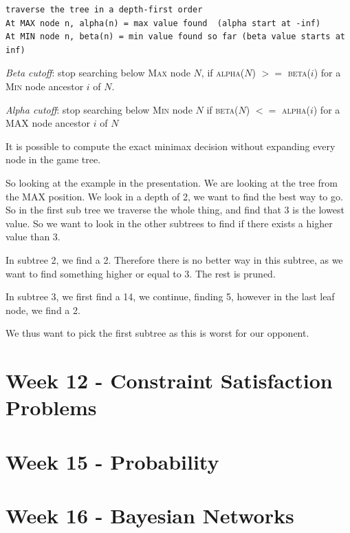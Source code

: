 \documentclass{article}
\begin{document}
\begin{lstlisting}[inputencoding=utf8/latin1, basicstyle=\footnotesize, keywordstyle=\color{blue}\bfseries, rulecolor=\color{black}]
traverse the tree in a depth-first order
At MAX node n, alpha(n) = max value found  (alpha start at -inf)
At MIN node n, beta(n) = min value found so far (beta value starts at inf)
\end{lstlisting}

\emph{Beta cutoff}: stop searching below \textsc{Max} node $N$, if
\textsc{alpha($N$)} $>=$ \textsc{beta($i$)} for a \textsc{Min} node ancestor $i$ of $N$.

\emph{Alpha cutoff}: stop searching below \textsc{Min} node $N$ if
\textsc{beta($N$)} $<=$ \textsc{alpha($i$)} for a MAX node ancestor $i$ of $N$

It is possible to compute the exact minimax decision without expanding every
node in the game tree.

So looking at the example in the presentation. We are looking at the tree from
the MAX position. We look in a depth of 2, we want to find the best way to go.
So in the first sub tree we traverse the whole thing, and find that 3 is the
lowest value. So we want to look in the other subtrees to find if there exists a
higher value than 3. 

In subtree 2, we find a 2. Therefore there is no better way in this subtree, as
we want to find something higher or equal to 3. The rest is pruned.

In subtree 3, we first find a 14, we continue, finding 5, however in the last
leaf node, we find a 2.

We thus want to pick the first subtree as this is worst for our opponent.

\newpage

\section{Week 12 - Constraint Satisfaction Problems}%
\label{sec:23_march_constraint_satisfaction_problems}



\newpage
\section{Week 15 - Probability}%
\label{sec:12_march_probability}

\newpage
\section{Week 16 - Bayesian Networks}%
\label{sec:20_march_bayesian_networks}
\end{document}
